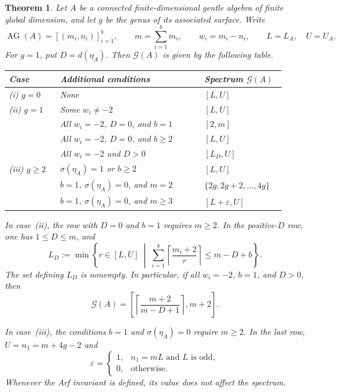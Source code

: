 \documentclass[11pt]{amsart}
\theoremstyle{definition}
\theoremstyle{plain}
\newtheorem{theorem}{Theorem}[section]
\theoremstyle{definition}
\theoremstyle{definition}
\newcommand{\AG}{\operatorname{AG}}
\newcommand{\GSpec}{\mathcal G}
\begin{document}
\begin{theorem}
\label{thm:intro-complete-spectrum}
Let $A$ be a connected finite-dimensional gentle algebra of finite
global dimension, and let $g$ be the genus of its associated surface.
Write
\[
 \AG(A)=[(m_i,n_i)]_{i=1}^b,
 \qquad m=\sum_{i=1}^b m_i,
 \qquad w_i=m_i-n_i,
 \qquad L=L_A,\quad U=U_A.
\]
For $g=1$, put $D=d(\eta_A)$.
Then $\GSpec(A)$ is given by the following table.

\begin{center}
\begingroup
\normalfont\small
\setlength{\tabcolsep}{4pt}
\renewcommand{\arraystretch}{1.3}
\begin{tabular}{@{}p{0.17\linewidth}p{0.48\linewidth}p{0.27\linewidth}@{}}
\hline
\textbf{Case}
&
\textbf{Additional conditions}
&
\textbf{Spectrum $\GSpec(A)$}
\\
\hline
\textup{(i)} $g=0$
&
None
&
$[L,U]$
\\
\hline
\textup{(ii)} $g=1$
&
Some $w_i\neq-2$
&
$[L,U]$
\\
&
All $w_i=-2$, $D=0$, and $b=1$
&
$[2,m]$
\\
&
All $w_i=-2$, $D=0$, and $b\geq2$
&
$[L,U]$
\\
&
All $w_i=-2$ and $D>0$
&
$[L_D,U]$
\\
\hline
\textup{(iii)} $g\geq2$
&
$\sigma(\eta_A)=1$ or $b\geq2$
&
$[L,U]$
\\
&
$b=1$, $\sigma(\eta_A)=0$, and $m=2$
&
$\{2g,2g+2,\ldots,4g\}$
\\
&
$b=1$, $\sigma(\eta_A)=0$, and $m\geq3$
&
$[L+\varepsilon,U]$
\\
\hline
\end{tabular}
\endgroup
\end{center}

In case~\textup{(ii)}, the row with $D=0$ and $b=1$ requires
$m\geq2$. In the positive-$D$ row, one has $1\leq D\leq m$, and
\begin{equation}
\label{eq:intro-spectrum-LD}
 L_D:=\min\left\{r\in[L,U]\;\middle|\;
   \sum_{i=1}^b\left\lceil\frac{m_i+2}{r}\right\rceil
       \leq m-D+b\right\}.
\end{equation}
The set defining $L_D$ is nonempty. In particular, if all $w_i=-2$,
$b=1$, and $D>0$, then
\[
 \GSpec(A)=
 \left[
   \left\lceil\frac{m+2}{m-D+1}\right\rceil,
   m+2
 \right].
\]

In case~\textup{(iii)}, the conditions $b=1$ and
$\sigma(\eta_A)=0$ require $m\geq2$.
In the last row, $U=n_1=m+4g-2$ and
\[
 \varepsilon=
 \begin{cases}
  1,&n_1=mL\text{ and }L\text{ is odd},\\
  0,&\text{otherwise}.
 \end{cases}
\]
Whenever the Arf invariant is defined, its value does not affect
the spectrum.
\end{theorem}
\end{document}
